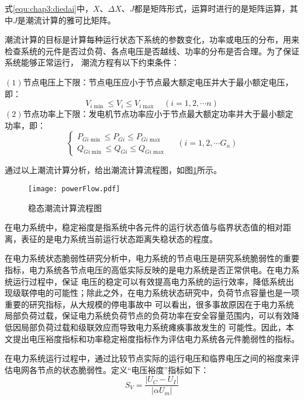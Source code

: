 式\ref{equ:chap3:diedai}中，$X$、$\Delta X$、$J$都是矩阵形式，运算时进行的是矩阵运算，其中$J$是潮流计算的雅可比矩阵。

潮流计算的目标是计算每种运行状态下系统的参数变化，功率或电压的分布，用来检查系统的元件是否过负荷、各点电压是否越线、功率的分布是否合理。为了保证系统能够正常运行，
潮流方程有以下约束条件：

$(1)$节点电压上下限：节点电压应小于节点最大额定电压并大于最小额定电压，即：
\begin{equation}
  V_{i \min } \leq V_{i} \leq V_{i \max } \quad(i=1,2, \cdots n)
  \end{equation}
$(2)$节点功率上下限：发电机节点功率应小于节点最大额定功率并大于最小额定功率，即：
\begin{equation}
\left\{\begin{array}{l}{P_{G i \min } \leq P_{G i} \leq P_{G i \max }} \\ {Q_{G i \min } \leq Q_{G i} \leq Q_{G i \max }}\end{array} \quad\left(i=1,2, \cdots G_{n}\right)\right.
\end{equation}

通过以上潮流计算分析，给出潮流计算流程图，如图\ref{fig:powerFlow}所示。
\begin{figure}[H] %
  \centering
  \texttt{[image: powerFlow.pdf]}
  \caption{稳态潮流计算流程图}
  \label{fig:powerFlow}
\end{figure}


在电力系统中，稳定裕度是指系统中各元件的运行状态值与临界状态值的相对距离，表征的是电力系统当前运行状态距离失稳状态的程度。

在电力系统状态脆弱性研究分析中，电力系统的节点电压是研究系统脆弱性的重要指标，电力系统各节点电压的高低实际反映的是电力系统是否正常供电。在电力系统运行过程中，保证
电压的稳定可以有效提高电力系统的运行效率，降低系统出现级联停电的可能性；除此之外，在电力系统状态研究中，负荷节点容量也是一项重要的研究指标，从大规模的停电事故中
可以看出，很多事故原因在于电力系统局部负荷过载，保证电力系统负荷节点的负荷功率在安全容量范围内，可以有效降低因局部负荷过载和级联效应而导致电力系统瘫痪事故发生的
可能性。因此，本文提出电压裕度指标和功率稳定裕度指标作为评估电力系统各元件脆弱性的指标。

在电力系统运行过程中，通过比较节点实际的运行电压和临界电压之间的裕度来评估电网各节点的状态脆弱性。定义“电压裕度”指标如下：
\begin{equation}
\label{equ:chap3:SV}
  S_V=\frac{\left|U_{C}-U_{I}\right|}{\left|\alpha U_{m}\right|}
\end{equation}

